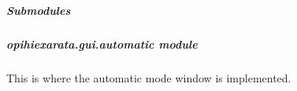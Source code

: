\documentclass[letterpaper,11pt,english]{sphinxmanual}
\begin{document}
\subparagraph{Submodules}
\label{\detokenize{code/opihiexarata.gui:submodules}}
\sphinxstepscope


\subparagraph{opihiexarata.gui.automatic module}
\label{\detokenize{code/opihiexarata.gui.automatic:module-opihiexarata.gui.automatic}}\label{\detokenize{code/opihiexarata.gui.automatic:opihiexarata-gui-automatic-module}}\label{\detokenize{code/opihiexarata.gui.automatic::doc}}
\sphinxAtStartPar
This is where the automatic mode window is implemented.
\end{document}
